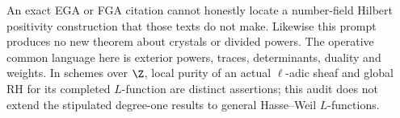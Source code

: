 An exact EGA or FGA citation cannot honestly locate a number-field Hilbert positivity construction that those texts do not make. Likewise this prompt produces no new theorem about crystals or divided powers. The operative common language here is exterior powers, traces, determinants, duality and weights. In schemes over $\Z$, local purity of an actual $\ell$-adic sheaf and global RH for its completed $L$-function are distinct assertions; this audit does not extend the stipulated degree-one results to general Hasse--Weil $L$-functions.
